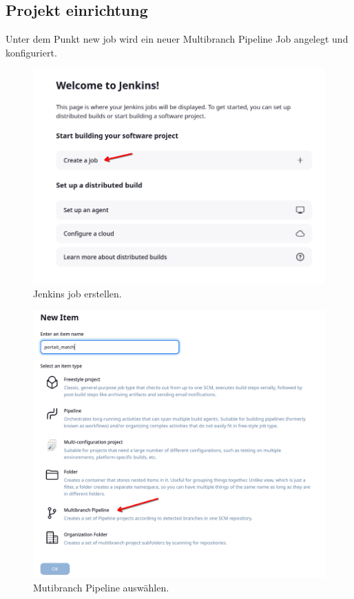 \subsection{Projekt einrichtung}

Unter dem Punkt \glqq new job\grqq{} wird ein neuer Multibranch Pipeline Job angelegt und konfiguriert.

\begin{figure}[H]
    \centering
    \includegraphics[scale=0.4]{res/Jenkins_01.png}
    \caption{Jenkins job erstellen.}
\end{figure}
\begin{figure}[H]
    \centering
    \includegraphics[scale=0.4]{res/Jenkins_02.png}
    \caption{Mutibranch Pipeline auswählen.}
\end{figure}

